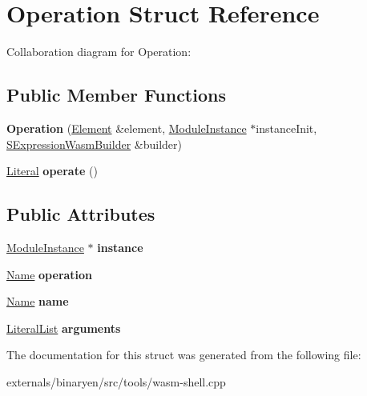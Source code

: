 \hypertarget{struct_operation}{}\section{Operation Struct Reference}
\label{struct_operation}


Collaboration diagram for Operation\+:
\subsection*{Public Member Functions}
\begin{DoxyCompactItemize}
\item 
\mbox{\label{struct_operation_ab0c7d47b0af0cc80e343b8df218cb52f}} 
{\bfseries Operation} (\mbox{\hyperlink{classwasm_1_1_element}{Element}} \&element, \mbox{\hyperlink{classwasm_1_1_module_instance}{Module\+Instance}} $\ast$instance\+Init, \mbox{\hyperlink{classwasm_1_1_s_expression_wasm_builder}{S\+Expression\+Wasm\+Builder}} \&builder)
\item 
\mbox{\label{struct_operation_ab025ce65757939f1cea54b0c9926122d}} 
\mbox{\hyperlink{classwasm_1_1_literal}{Literal}} {\bfseries operate} ()
\end{DoxyCompactItemize}
\subsection*{Public Attributes}
\begin{DoxyCompactItemize}
\item 
\mbox{\label{struct_operation_a289627101c1729e8c1381ce4ba0e436e}} 
\mbox{\hyperlink{classwasm_1_1_module_instance}{Module\+Instance}} $\ast$ {\bfseries instance}
\item 
\mbox{\label{struct_operation_aeb653c6a277f69a971ff47d7a72caa71}} 
\mbox{\hyperlink{structwasm_1_1_name}{Name}} {\bfseries operation}
\item 
\mbox{\label{struct_operation_aa3e78bed5b05b94a82c8db3fd957a138}} 
\mbox{\hyperlink{structwasm_1_1_name}{Name}} {\bfseries name}
\item 
\mbox{\label{struct_operation_a8ca0880d6f81797c874e5b16a9926cbe}} 
\mbox{\hyperlink{classstd_1_1vector}{Literal\+List}} {\bfseries arguments}
\end{DoxyCompactItemize}


The documentation for this struct was generated from the following file\+:\begin{DoxyCompactItemize}
\item 
externals/binaryen/src/tools/wasm-\/shell.\+cpp\end{DoxyCompactItemize}
